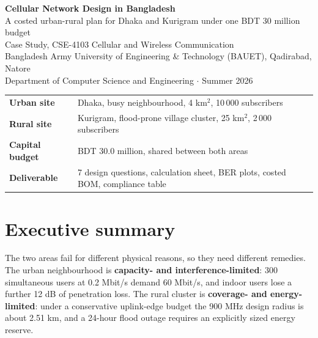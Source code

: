 \documentclass[9pt,a4paper]{extarticle}
\newcommand{\key}[1]{\textbf{#1}}
\begin{document}
\begin{center}
{\LARGE\bfseries Cellular Network Design in Bangladesh}\\[3pt]
{\large A costed urban-rural plan for Dhaka and Kurigram under one BDT 30 million budget}\\[8pt]
{\normalsize Case Study, CSE-4103 Cellular and Wireless Communication}\\[2pt]
{\small Bangladesh Army University of Engineering \& Technology (BAUET), Qadirabad, Natore}\\[2pt]
{\small Department of Computer Science and Engineering $\cdot$ Summer 2026}
\end{center}

\vspace{-4pt}
\begin{center}\small
\begin{tabular}{@{}ll@{}}
\toprule
\textbf{Urban site} & Dhaka, busy neighbourhood, 4 km$^2$, 10\,000 subscribers \\
\textbf{Rural site} & Kurigram, flood-prone village cluster, 25 km$^2$, 2\,000 subscribers \\
\textbf{Capital budget} & BDT 30.0 million, shared between both areas \\
\textbf{Deliverable} & 7 design questions, calculation sheet, BER plots, costed BOM, compliance table \\
\bottomrule
\end{tabular}
\end{center}

\section*{Executive summary}

The two areas fail for different physical reasons, so they need different remedies. The urban
neighbourhood is \key{capacity- and interference-limited}: 300 simultaneous users at 0.2 Mbit/s
demand 60 Mbit/s, and indoor users lose a further 12 dB of penetration loss. The rural cluster is
\key{coverage- and energy-limited}: under a conservative uplink-edge budget the 900 MHz design radius is about 2.51 km, and
a 24-hour flood outage requires an explicitly sized energy reserve.
\end{document}
